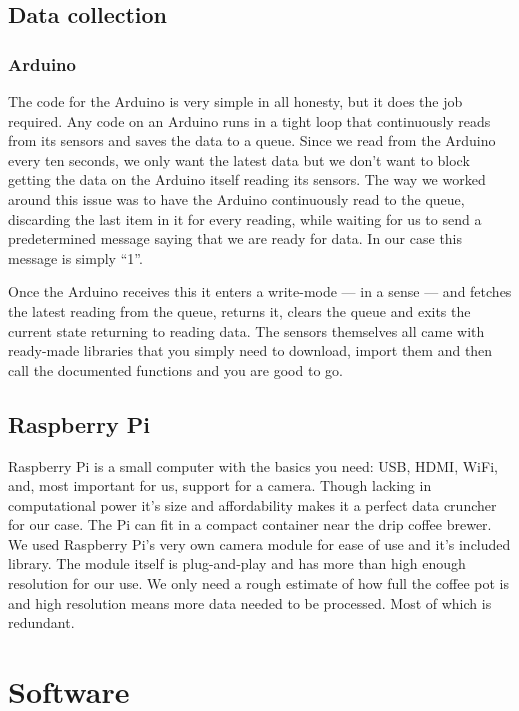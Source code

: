 \documentclass[12pt,a4paper,oneside,article]{memoir}
\numberwithin{equation}{chapter}
\begin{document}
\subsection{Data collection}\label{sec:data-collection}
\subsubsection{Arduino}\label{sec:arduino}
The code for the Arduino is very simple in all honesty, but it does the job
required. Any code on an Arduino runs in a tight loop that continuously reads
from its sensors and saves the data to a queue. Since we read from the Arduino
every ten seconds, we only want the latest data but we don't want to block
getting the data on the Arduino itself reading its sensors. The way we worked
around this issue was to have the Arduino continuously read to the queue,
discarding the last item in it for every reading, while waiting for us to send a
predetermined message saying that we are ready for data. In our case this 
message is simply ``1''.

Once the Arduino receives this it enters a write-mode --- in a sense --- and
fetches the latest reading from the queue, returns it, clears the queue and
exits the current state returning to reading data. The sensors themselves all
came with ready-made libraries that you simply need to download, import them and
then call the documented functions and you are good to go.


\subsection{Raspberry Pi}\label{sec:raspberry-pi}
Raspberry Pi is a small computer with the basics you need: USB, HDMI, WiFi,
and, most important for us, support for a camera. Though lacking in 
computational power it's size and affordability makes it a perfect data 
cruncher for our case. The Pi can fit in a compact container near the 
drip coffee brewer. We used Raspberry Pi's very own camera module for ease of 
use and it's included library. The module itself is plug-and-play and has more 
than high enough resolution for our use. We only need a rough estimate of how 
full the coffee pot is and high resolution means more data needed to be 
processed. Most of which is redundant. 

\section{Software}\label{sec:software}
\end{document}
